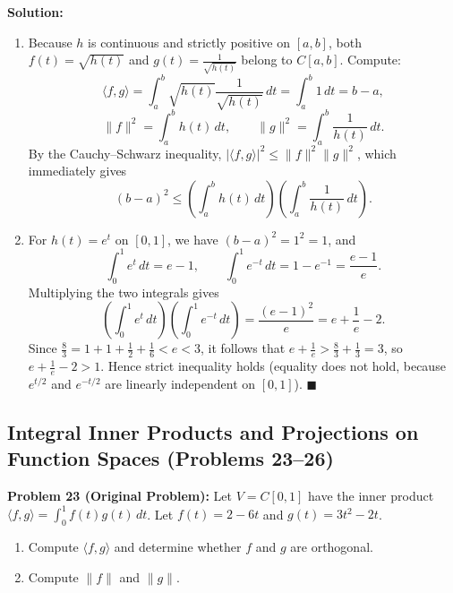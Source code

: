 \documentclass[11pt, letterpaper]{article}
\theoremstyle{definition}
\theoremstyle{remark}
\begin{document}
\textbf{Solution:}
\begin{enumerate}[label=(\alph*)]
    \item Because $h$ is continuous and strictly positive on $[a, b]$, both $f(t) = \sqrt{h(t)}$ and $g(t) = \frac{1}{\sqrt{h(t)}}$ belong to $C[a, b]$. Compute:
    \[
    \langle f, g \rangle = \int_a^b \sqrt{h(t)}\frac{1}{\sqrt{h(t)}}\,dt = \int_a^b 1\,dt = b - a,
    \]
    \[
    \|f\|^2 = \int_a^b h(t)\,dt, \qquad \|g\|^2 = \int_a^b \frac{1}{h(t)}\,dt.
    \]
    By the Cauchy--Schwarz inequality, $|\langle f, g \rangle|^2 \le \|f\|^2 \|g\|^2$, which immediately gives
    \[
    (b - a)^2 \le \left(\int_a^b h(t)\,dt\right)\left(\int_a^b \frac{1}{h(t)}\,dt\right).
    \]
    \item For $h(t) = e^t$ on $[0, 1]$, we have $(b - a)^2 = 1^2 = 1$, and
    \[
    \int_0^1 e^t\,dt = e - 1, \qquad \int_0^1 e^{-t}\,dt = 1 - e^{-1} = \frac{e - 1}{e}.
    \]
    Multiplying the two integrals gives
    \[
    \left(\int_0^1 e^t\,dt\right)\left(\int_0^1 e^{-t}\,dt\right) = \frac{(e - 1)^2}{e} = e + \frac{1}{e} - 2.
    \]
    Since $\frac{8}{3} = 1 + 1 + \frac{1}{2} + \frac{1}{6} < e < 3$, it follows that $e + \frac{1}{e} > \frac{8}{3} + \frac{1}{3} = 3$, so $e + \frac{1}{e} - 2 > 1$. Hence strict inequality holds (equality does not hold, because $e^{t/2}$ and $e^{-t/2}$ are linearly independent on $[0, 1]$). $\blacksquare$
\end{enumerate}

\subsection{Integral Inner Products and Projections on Function Spaces (Problems 23--26)}

\textbf{Problem 23 (Original Problem):} Let $V = C[0, 1]$ have the inner product $\langle f, g \rangle = \int_0^1 f(t)g(t)\,dt$. Let $f(t) = 2 - 6t$ and $g(t) = 3t^2 - 2t$.
\begin{enumerate}[label=(\alph*)]
    \item Compute $\langle f, g \rangle$ and determine whether $f$ and $g$ are orthogonal.
    \item Compute $\|f\|$ and $\|g\|$.
\end{enumerate}
\end{document}
